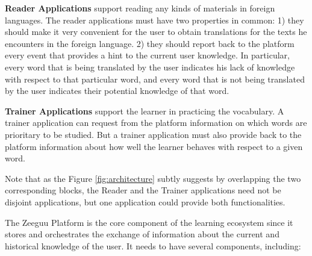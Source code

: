 \begin{description}
	
	\item {\bf Reader Applications} 
	support reading any kinds of materials in foreign languages. The reader applications must have two properties in common: 
		1) they should make it very convenient for the user to obtain translations for the texts he encounters in the foreign language. 
		2) they should report back to the platform every event that provides a hint to the current user knowledge. In particular, every word that is being translated by the user indicates his lack of knowledge with respect to that particular word, and every word that is not being translated by the user indicates their potential knowledge of that word.
	
		\item {\bf Trainer Applications} support the learner in practicing the vocabulary. A trainer application can request from the platform information on which words are prioritary to be studied. But a trainer application must also provide back to the platform information about how well the learner behaves with respect to a given word.

\end{description}

Note that as the Figure \ref{fig:architecture} subtly suggests by overlapping the two corresponding blocks, the Reader and the Trainer applications need not be disjoint applications, but one application could provide both functionalities.


The Zeeguu Platform is the core component of the learning ecosystem since it stores and orchestrates the exchange of information about the current and historical knowledge of the user. It needs to have several components, including: 

